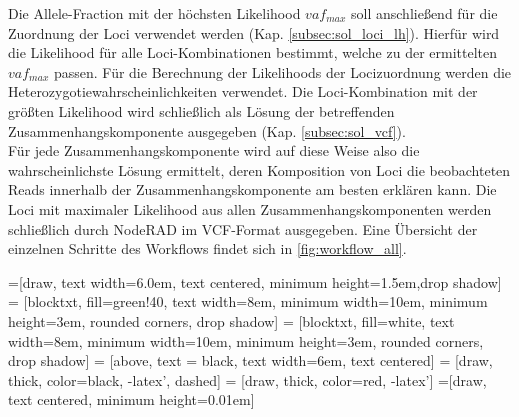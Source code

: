 Die Allele-Fraction mit der höchsten Likelihood $vaf_{max}$ soll anschließend für die Zuordnung der Loci verwendet werden (Kap. \ref{subsec:sol_loci_lh}). Hierfür wird die Likelihood für alle Loci-Kombinationen bestimmt, welche zu der ermittelten $vaf_{max}$ passen. Für die Berechnung der Likelihoods der Locizuordnung werden die Heterozygotiewahrscheinlichkeiten verwendet. Die Loci-Kombination mit der größten Likelihood wird schließlich als Lösung der betreffenden Zusammenhangskomponente ausgegeben (Kap. \ref{subsec:sol_vcf}).\\

Für jede Zusammenhangskomponente wird auf diese Weise also die wahrscheinlichste Lösung ermittelt, deren Komposition von Loci die beobachteten Reads innerhalb der Zusammenhangskomponente am besten erklären kann. Die Loci mit maximaler Likelihood aus allen Zusammenhangskomponenten werden schließlich durch NodeRAD im VCF-Format ausgegeben. Eine Übersicht der einzelnen Schritte des Workflows findet sich in \autoref{fig:workflow_all}.  \\
\usetikzlibrary{shadows,arrows}

=[draw, text width=6.0em, text centered,
minimum height=1.5em,drop shadow]
 = [blocktxt, fill=green!40, text width=8em, minimum width=10em,
minimum height=3em, rounded corners, drop shadow]
 = [blocktxt, fill=white, text width=8em, minimum width=10em,
minimum height=3em, rounded corners, drop shadow]
 = [above, text = black, text width=6em, text centered]
 = [draw, thick, color=black, -latex', dashed]
 = [draw, thick, color=red, -latex']
=[draw, text centered, minimum height=0.01em]

\newcommand{\blockdist}{1.3}
\newcommand{\edgedist}{1.5}

\newcommand{\blockitem}[2]{node (p#1) [blockitem]
	{\textbf{\textit{#2}}}}

\newcommand{\ioitem}[2]{node (p#1) [ioitem]
	{\textbf{\textit{#2}}}}

\newcommand{\bond}[3]{
	\draw[very thick, #1] (#3, 0) -- (#3, 0.35);
	\draw[very thick, densely dotted] (#3, 0.35) -- (#3, 0.65);
	\draw[very thick, #2] (#3, 0.65) -- (#3, 1);
}
\newcommand{\background}[5]{%
	\begin{pgfonlayer}{background}
		\path (#1.west |- #2.north)+(-3.3,0.3) node (a1) {};
		\path (#3.east |- #4.south)+(+0.5,-0.25) node (a2) {};
		\path[fill=blue!20,rounded corners, draw=black]
		(a1) rectangle (a2);
		\path (a1.east |- a1.south) +(-3.0,-1.0) node (u1)[sectiontxt]
		{\textbf{\textit{#5}}};
\end{pgfonlayer}}

